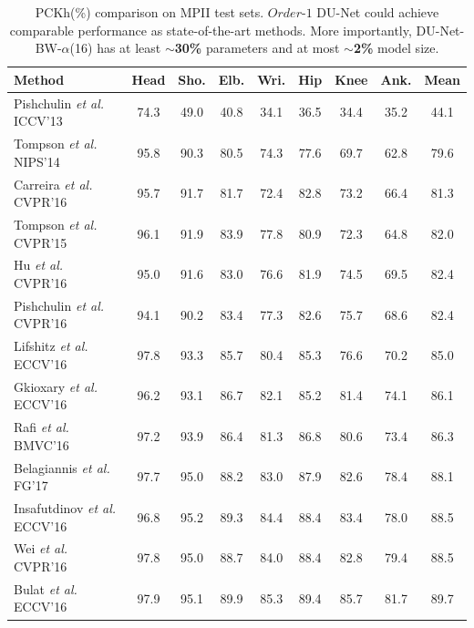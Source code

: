 \begin{table}[t!]
\begin{center}
\small
\setlength\tabcolsep{1.5pt}
\caption{PCKh(\%) comparison on MPII test sets. $Order$-$1$ DU-Net could achieve comparable performance as state-of-the-art methods. More importantly, DU-Net-BW-$\alpha$(16) has at least $\sim${\bf 30\%} parameters and at most $\sim${\bf 2\%} model size.}\label{tb:mpii}
\begin{tabular}{@{}lcccccccc@{}}
\toprule
Method & Head & Sho. & Elb. & Wri. & Hip & Knee & Ank. & Mean\\
\hline
Pishchulin \textit{et al.} ICCV'13 \cite{pishchulin2013strong} & 74.3 & 49.0 & 40.8 & 34.1 & 36.5 & 34.4 & 35.2 & 44.1\\
Tompson \textit{et al. } NIPS'14 \cite{tompson2014joint} & 95.8 & 90.3 & 80.5 & 74.3 & 77.6 & 69.7 & 62.8 & 79.6\\
Carreira \textit{et al.} CVPR'16 \cite{carreira2016human} & 95.7 & 91.7 & 81.7 & 72.4 & 82.8 & 73.2 & 66.4 & 81.3\\
Tompson \textit{et al.} CVPR'15 \cite{tompson2015efficient}& 96.1 & 91.9 & 83.9 & 77.8 & 80.9 & 72.3 & 64.8 & 82.0\\
Hu \textit{et al.} CVPR'16 \cite{hu2016bottom}& 95.0 & 91.6 & 83.0 & 76.6 & 81.9 & 74.5 & 69.5 & 82.4\\
Pishchulin \textit{et al.} CVPR'16 \cite{pishchulin2016deepcut}&94.1 & 90.2 & 83.4 & 77.3 & 82.6 & 75.7 & 68.6 & 82.4\\
Lifshitz \textit{et al.} ECCV'16 \cite{lifshitz2016human} & 97.8 & 93.3 & 85.7 & 80.4 & 85.3 & 76.6 & 70.2 & 85.0\\
Gkioxary \textit{et al.} ECCV'16 \cite{gkioxari2016chained} & 96.2 & 93.1 & 86.7 & 82.1 & 85.2 & 81.4 & 74.1 & 86.1\\
Rafi \textit{et al.} BMVC'16 \cite{rafi2016efficient} & 97.2 & 93.9 & 86.4 & 81.3 & 86.8 & 80.6 & 73.4 & 86.3\\
Belagiannis \textit{et al.} FG'17 \cite{belagiannis2017recurrent}&97.7 & 95.0 & 88.2 & 83.0 & 87.9 & 82.6 & 78.4 & 88.1\\
Insafutdinov \textit{et al.} ECCV'16 \cite{insafutdinov2016deepercut}&96.8 & 95.2 & 89.3 & 84.4 & 88.4 & 83.4 & 78.0 & 88.5\\
Wei \textit{et al.} CVPR'16 \cite{wei2016convolutional} & 97.8 & 95.0 & 88.7 & 84.0 & 88.4 & 82.8 & 79.4 & 88.5\\
Bulat \textit{et al.} ECCV'16 \cite{bulat2016human} & 97.9 & 95.1 & 89.9 & 85.3 & 89.4 & 85.7 & 81.7 & 89.7\\

\end{tabular}
\end{center}
\end{table}
